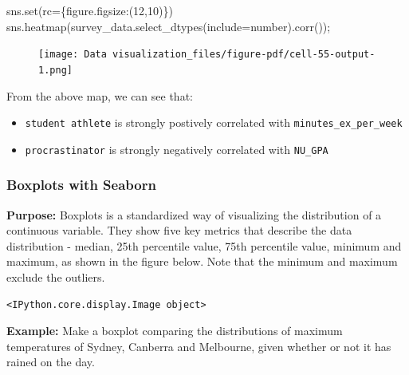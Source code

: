 \documentclass[
  letterpaper,
  DIV=11,
  numbers=noendperiod]{scrreprt}
\newenvironment{Shaded}{\begin{snugshade}}{\end{snugshade}}
\newcommand{\BuiltInTok}[1]{\textcolor[rgb]{0.00,0.23,0.31}{#1}}
\newcommand{\DecValTok}[1]{\textcolor[rgb]{0.68,0.00,0.00}{#1}}
\newcommand{\NormalTok}[1]{\textcolor[rgb]{0.00,0.23,0.31}{#1}}
\newcommand{\OperatorTok}[1]{\textcolor[rgb]{0.37,0.37,0.37}{#1}}
\newcommand{\StringTok}[1]{\textcolor[rgb]{0.13,0.47,0.30}{#1}}
\providecommand{\tightlist}{%
  \setlength{\itemsep}{0pt}\setlength{\parskip}{0pt}}\usepackage{longtable,booktabs,array}
\begin{document}
\begin{Shaded}
\begin{Highlighting}[]
\NormalTok{sns.}\BuiltInTok{set}\NormalTok{(rc}\OperatorTok{=}\NormalTok{\{}\StringTok{\textquotesingle{}figure.figsize\textquotesingle{}}\NormalTok{:(}\DecValTok{12}\NormalTok{,}\DecValTok{10}\NormalTok{)\})}
\NormalTok{sns.heatmap(survey\_data.select\_dtypes(include}\OperatorTok{=}\StringTok{\textquotesingle{}number\textquotesingle{}}\NormalTok{).corr())}\OperatorTok{;}
\end{Highlighting}
\end{Shaded}

\begin{figure}[H]

{\centering \texttt{[image: Data visualization\_files/figure-pdf/cell-55-output-1.png]}

}

\end{figure}

From the above map, we can see that:

\begin{itemize}
\tightlist
\item
  \texttt{student\ athlete} is strongly postively correlated with
  \texttt{minutes\_ex\_per\_week}
\item
  \texttt{procrastinator} is strongly negatively correlated with
  \texttt{NU\_GPA}
\end{itemize}

\hypertarget{boxplots-with-seaborn}{%
\subsubsection{Boxplots with Seaborn}\label{boxplots-with-seaborn}}

\textbf{Purpose:} Boxplots is a standardized way of visualizing the
distribution of a continuous variable. They show five key metrics that
describe the data distribution - median, 25th percentile value, 75th
percentile value, minimum and maximum, as shown in the figure below.
Note that the minimum and maximum exclude the outliers.

\begin{verbatim}
<IPython.core.display.Image object>
\end{verbatim}

\textbf{Example:} Make a boxplot comparing the distributions of maximum
temperatures of Sydney, Canberra and Melbourne, given whether or not it
has rained on the day.
\end{document}
